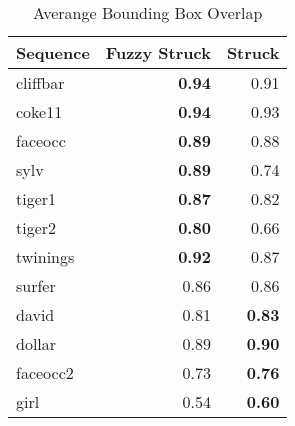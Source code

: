 

\begin{table}[!t]
    \caption{Averange Bounding Box Overlap}
    \label{tab:results}
    \centering
    \begin{tabular}{l r r}
        \toprule
        Sequence & Fuzzy Struck & Struck \\
        \midrule
        cliffbar &  \textbf{0.94} &         0.91  \\
        coke11   &  \textbf{0.94} &         0.93  \\
        faceocc  &  \textbf{0.89} &         0.88  \\
        sylv     &  \textbf{0.89} &         0.74  \\
        tiger1   &  \textbf{0.87} &         0.82  \\
        tiger2   &  \textbf{0.80} &         0.66  \\
        twinings &  \textbf{0.92} &         0.87  \\
        surfer   &          0.86  &         0.86  \\
        david    &          0.81  & \textbf{0.83} \\
        dollar   &          0.89  & \textbf{0.90} \\
        faceocc2 &          0.73  & \textbf{0.76} \\
        girl     &          0.54  & \textbf{0.60} \\
        \bottomrule
    \end{tabular}
\end{table}
